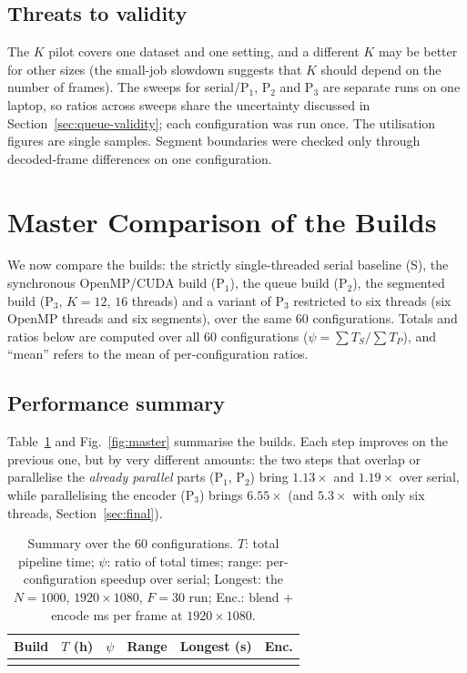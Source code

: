 \documentclass[conference]{IEEEtran}
\begin{document}
\subsection{Threats to validity}
The $K$ pilot covers one dataset and one setting, and a different $K$ may be better for other sizes (the small-job slowdown suggests that $K$ should depend on the number of frames). The sweeps for serial/P$_1$, P$_2$ and P$_3$ are separate runs on one laptop, so ratios across sweeps share the uncertainty discussed in Section~\ref{sec:queue-validity}; each configuration was run once. The utilisation figures are single samples. Segment boundaries were checked only through decoded-frame differences on one configuration.

\section{Master Comparison of the Builds}
\label{sec:master}
We now compare the builds: the strictly single-threaded serial baseline (S), the synchronous OpenMP/CUDA build (P$_1$), the queue build (P$_2$), the segmented build (P$_3$, $K{=}12$, $16$ threads) and a variant of P$_3$ restricted to six threads (six OpenMP threads and six segments), over the same $60$ configurations. Totals and ratios below are computed over all $60$ configurations ($\psi=\sum T_S/\sum T_P$), and ``mean'' refers to the mean of per-configuration ratios.

\subsection{Performance summary}
Table~\ref{tab:master-perf} and Fig.~\ref{fig:master} summarise the builds. Each step improves on the previous one, but by very different amounts: the two steps that overlap or parallelise the \emph{already parallel} parts (P$_1$, P$_2$) bring $1.13\times$ and $1.19\times$ over serial, while parallelising the encoder (P$_3$) brings $6.55\times$ (and $5.3\times$ with only six threads, Section~\ref{sec:final}).

\begin{table}[t]
\caption{Summary over the $60$ configurations. $T$: total pipeline time; $\psi$: ratio of total times; range: per-configuration speedup over serial; Longest: the $N{=}1000$, $1920{\times}1080$, $F{=}30$ run; Enc.: blend + encode ms per frame at $1920{\times}1080$.}
\label{tab:master-perf}
\centering
\footnotesize
\setlength{\tabcolsep}{3pt}
\begin{tabular}{@{}lrrcrr@{}}
\toprule
Build & $T$ (h) & $\psi$ & Range & Longest (s) & Enc. \\
\midrule
\\
\bottomrule
\end{tabular}
\end{table}
\end{document}
